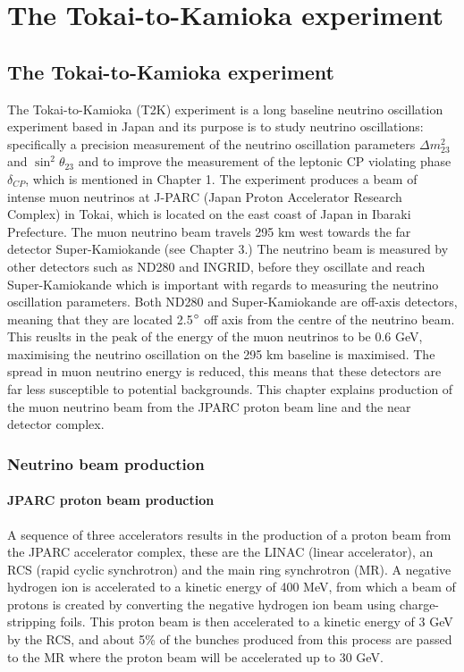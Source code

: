 \chapter{The Tokai-to-Kamioka experiment}
\label{chp:t2kdetector}

\section{The Tokai-to-Kamioka experiment}
The Tokai-to-Kamioka (T2K) experiment is a long baseline neutrino oscillation experiment based in Japan and its purpose is to study neutrino oscillations: specifically a precision measurement of the neutrino oscillation parameters $\Delta m_{23}^{2}$ and $\sin ^{2} \theta_{23}$ and to improve the measurement of the leptonic CP violating phase $\delta_{CP}$, which is mentioned in Chapter 1. The experiment produces a beam of intense muon neutrinos at J-PARC (Japan Proton Accelerator Research Complex) in Tokai, which is located on the east coast of Japan in Ibaraki Prefecture. The muon neutrino beam travels 295 km west towards the far detector Super-Kamiokande (see Chapter 3.)  The neutrino beam is measured by other detectors such as ND280 and INGRID, before they oscillate and reach Super-Kamiokande which is important with regards to measuring the neutrino oscillation parameters. Both ND280 and Super-Kamiokande are off-axis detectors, meaning that they are located 2.5$\degree$ off axis from the centre of the neutrino beam. This reuslts in the peak of the energy of the muon neutrinos to be 0.6 GeV, maximising the neutrino oscillation on the 295 km baseline is maximised. The spread in muon neutrino energy is reduced, this means that these detectors are far less susceptible to potential backgrounds. This chapter explains production of the muon neutrino beam from the JPARC proton beam line and the near detector complex.

\subsection{Neutrino beam production}

\subsubsection{JPARC proton beam production}


A sequence of three accelerators results in the production of a proton beam from the JPARC accelerator complex, these are the LINAC (linear accelerator), an RCS (rapid cyclic synchrotron) and the main ring synchrotron (MR). A negative hydrogen ion is accelerated to a kinetic energy of 400 MeV, from which a beam of protons is created by converting the negative hydrogen ion beam using charge-stripping foils. This proton beam is then accelerated to a kinetic energy of 3 GeV by the RCS, and about 5\% of the bunches produced from this process are passed to the MR where the proton beam will be accelerated up to 30 GeV. 

